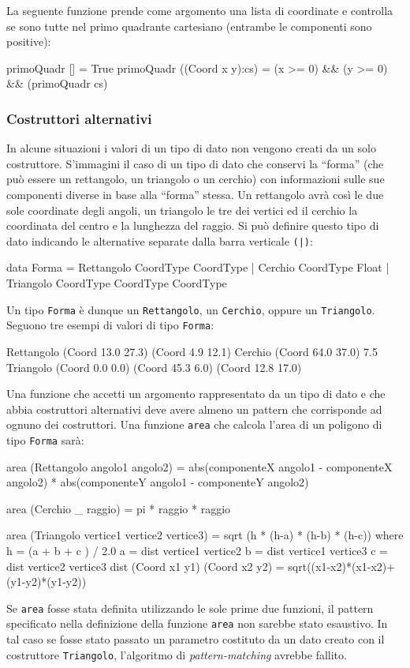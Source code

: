 La seguente funzione prende come argomento una lista di coordinate e 
controlla se sono tutte nel primo quadrante cartesiano (entrambe le componenti sono positive):
\begin{haskellCode}
primoQuadr []               = True
primoQuadr ((Coord x y):cs) = (x >= 0) && 
                              (y >= 0) && 
                              (primoQuadr cs)
\end{haskellCode}

\subsubsection{Costruttori 
alternativi}
In alcune situazioni i valori di un tipo di dato non vengono creati da un 
solo costruttore. S'immagini il caso di un tipo di dato che conservi la ``forma'' 
(che pu\`o essere un rettangolo, un triangolo o un 
cerchio) con informazioni sulle sue componenti diverse in base alla  
``forma'' stessa. Un rettangolo avr\`a cos\`i le due sole coordinate degli angoli, un triangolo le tre dei vertici ed il 
cerchio la 
coordinata del centro e la lunghezza del raggio. Si pu\`o definire questo 
tipo di dato indicando le alternative separate dalla barra verticale 
\verb"(|)":
\begin{haskellCode}
data Forma = Rettangolo CoordType CoordType
    | Cerchio CoordType Float
    | Triangolo CoordType CoordType CoordType
\end{haskellCode}
%
Un tipo \verb"Forma" \`e dunque un \verb"Rettangolo", un \verb"Cerchio", 
oppure un \verb"Triangolo". Seguono tre esempi di valori di tipo 
\verb"Forma":
\begin{haskellCode}
Rettangolo (Coord 13.0 27.3) (Coord 4.9 12.1)
Cerchio (Coord 64.0 37.0) 7.5
Triangolo (Coord 0.0 0.0) (Coord 45.3 6.0) (Coord 12.8 17.0)
\end{haskellCode}
%
Una funzione che accetti un argomento rappresentato da un tipo di dato e che abbia costruttori 
alternativi deve avere almeno un pattern che corrisponde ad ognuno dei 
costruttori. Una funzione \verb"area" che calcola l'area di un poligono di 
tipo \verb"Forma" sar\`a:
\begin{haskellCode}
area (Rettangolo angolo1 angolo2)
    = abs(componenteX angolo1 - componenteX angolo2) *
      abs(componenteY angolo1 - componenteY angolo2)
      
area (Cerchio _ raggio) = pi * raggio * raggio

area (Triangolo vertice1 vertice2 vertice3)
    = sqrt (h * (h-a) * (h-b) * (h-c))
  where
    h = (a + b + c ) / 2.0
    a = dist vertice1 vertice2
    b = dist vertice1 vertice3
    c = dist vertice2 vertice3
    dist (Coord x1 y1) (Coord x2 y2)
    	= sqrt((x1-x2)*(x1-x2)+(y1-y2)*(y1-y2))
\end{haskellCode}
%
Se \verb"area" fosse stata definita utilizzando le sole prime due funzioni, il pattern 
specificato nella definizione della funzione \verb"area" non sarebbe stato 
esaustivo. In tal caso se fosse stato passato un parametro costituto da un 
dato creato con il costruttore \verb"Triangolo", l'algoritmo di \emph{pattern-matching}
avrebbe fallito.

